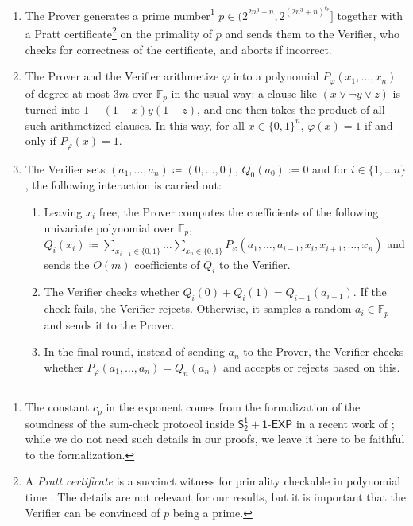 \documentclass[11pt]{article}
\newcommand{\SOTEXP}{\mathsf{S^1_2} + \mathsf{1\textsf{-}EXP}}
\theoremstyle{definition}
\theoremstyle{plain}
\theoremstyle{remark}
\begin{document}
\begin{enumerate}
    \item The Prover generates a prime number\footnote{The constant $c_p$ in the exponent comes from the formalization of the soundness of the sum-check protocol inside $\SOTEXP$ in a recent work of \citeauthor{Kha23} \cite{Kha23}; while we do not need such details in our proofs, we leave it here to be faithful to the formalization.} $p \in (2^{2n^3 + n}, 2^{{(2n^3+n)}^{c_p}}]$ together with a Pratt certificate\footnote{A \emph{Pratt certificate} is a succinct witness for primality checkable in polynomial time \cite{Pra75}. The details are not relevant for our results, but it is important that the Verifier can be convinced of $p$ being a prime.} on the primality of $p$ and sends them to the Verifier, who checks for correctness of the certificate, and aborts if incorrect.
    \item The Prover and the Verifier arithmetize $\varphi$ into a polynomial $P_\varphi(x_1, \dots, x_n)$ of degree at most $3m$ over $\mathbb{F}_p$ in the usual way: a clause like $(x \lor \neg y \lor z)$ is turned into $1 - (1-x)y(1-z)$, and one then takes the product of all such arithmetized clauses. In this way, for all $x\in \{0,1\}^n$, $\varphi(x) = 1$ if and only if $P_\varphi(x) = 1$.

    \item The Verifier sets $( a_1, \dots, a_n) \coloneqq (0, \dots, 0)$, $Q_0(a_0):=0$ and for $i \in \{ 1, \dots n\}$, the following interaction is carried out:
    \begin{enumerate}
        \item Leaving $x_i$ free, the Prover computes the coefficients of the following univariate polynomial over $\mathbb{F}_p$,
        $Q_i(x_i) \coloneqq \sum_{x_{i+1}\in\{0,1\}} \dots \sum_{x_{n}\in\{0,1\}} P_\varphi(a_1, \dots, a_{i-1}, x_i, x_{i+1}, \dots, x_n)$
        and sends the $O(m)$ coefficients of $Q_i$ to the Verifier.

        \item The Verifier checks whether $Q_i(0) + Q_i(1) = Q_{i-1}(a_{i-1})$. If the check fails, the Verifier rejects. Otherwise, it samples a random $a_{i} \in \mathbb{F}_p$ and sends it to the Prover.

        \item In the final round, instead of sending $a_n$ to the Prover, the Verifier checks whether $P_\varphi(a_1, \dots, a_n) = Q_n(a_n)$ and accepts or rejects based on this.
    \end{enumerate}
\end{enumerate}
\end{document}
